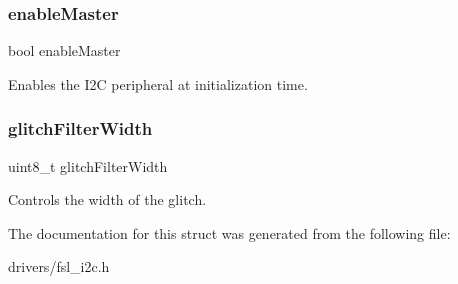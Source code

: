 \subsubsection{\texorpdfstring{enableMaster}{enableMaster}}
{\footnotesize\ttfamily bool enable\+Master}

Enables the I2C peripheral at initialization time. \mbox{\label{struct__i2c__master__config_a0ec674bca5cb7bb8a6c51a44a5fc4314}} 
\subsubsection{\texorpdfstring{glitchFilterWidth}{glitchFilterWidth}}
{\footnotesize\ttfamily uint8\+\_\+t glitch\+Filter\+Width}

Controls the width of the glitch. 

The documentation for this struct was generated from the following file\+:\begin{DoxyCompactItemize}
\item 
drivers/fsl\+\_\+i2c.\+h\end{DoxyCompactItemize}
